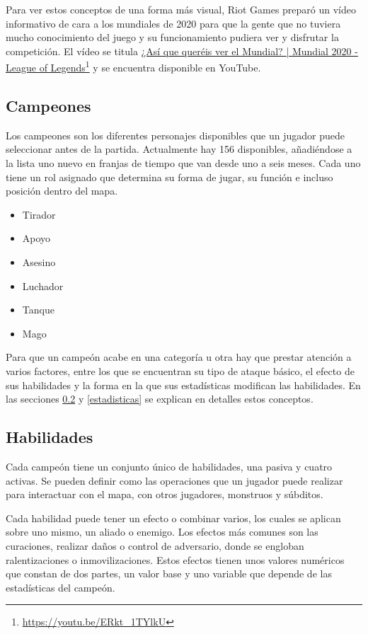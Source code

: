 Para ver estos conceptos de una forma más visual, Riot Games preparó un vídeo informativo de cara a los mundiales de 2020 para que la gente que no tuviera mucho conocimiento del juego y su funcionamiento pudiera ver y disfrutar la competición. El vídeo se titula \href{https://www.youtube.com/watch?v=ERkt_1TYlkU}{¿Así que queréis ver el Mundial? | Mundial 2020 - League of Legends}\footnote{\url{https://youtu.be/ERkt_1TYlkU}} y se encuentra disponible en YouTube.


\subsection{Campeones}
Los campeones son los diferentes personajes disponibles que un jugador puede seleccionar antes de la partida. Actualmente hay 156 disponibles, añadiéndose a la lista uno nuevo en franjas de tiempo que van desde uno a seis meses. Cada uno tiene un rol asignado que determina su forma de jugar, su función e incluso posición dentro del mapa.
\begin{itemize}
	\tightlist
	\item Tirador
	\item Apoyo
	\item Asesino
	\item Luchador
	\item Tanque
	\item Mago
\end{itemize}

Para que un campeón acabe en una categoría u otra hay que prestar atención a varios factores, entre los que se encuentran su tipo de ataque básico, el efecto de sus habilidades y la forma en la que sus estadísticas modifican las habilidades. En las secciones \ref{habilidades} y \ref{estadisticas} se explican en detalles estos conceptos.

\subsection{Habilidades}
\label{habilidades}
Cada campeón tiene un conjunto único de habilidades, una pasiva y cuatro activas. Se pueden definir como las operaciones que un jugador puede realizar para interactuar con el mapa, con otros jugadores, monstruos y súbditos.

Cada habilidad puede tener un efecto o combinar varios, los cuales se aplican sobre uno mismo, un aliado o enemigo. Los efectos más comunes son las curaciones, realizar daños o control de adversario, donde se engloban ralentizaciones o inmovilizaciones. Estos efectos tienen unos valores numéricos que constan de dos partes, un valor base y uno variable que depende de las estadísticas del campeón.

